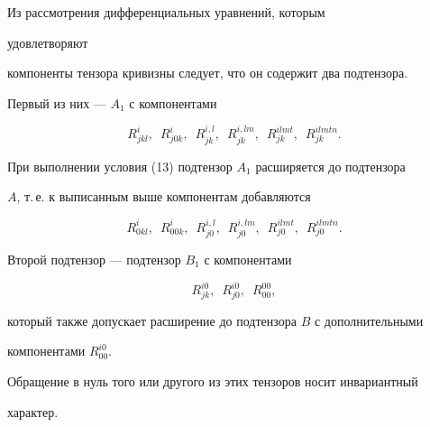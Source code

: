 \begin{notes} Из рассмотрения дифференциальных уравнений, которым 


удовлетворяют 


компоненты тензора кривизны следует, что он содержит два подтензора. 


Первый из них --- $A_1$ с компонентами 


$$ 


R^i_{jkl},\ \; R^i_{j0k},\ \; R^{i,l}_{jk}, \ \; 


R^{i,lm}_{jk}, \ \; R^{ilmt}_{jk}, \ \; R^{ilmtn}_{jk}. 


$$ 


При выполнении условия (13) подтензор $A_1$ расширяется до подтензора 


$A$, т.\,е. к выписанным выше компонентам добавляются 


$$ 


R^i_{0kl}, \ \; R^i_{00k}, \ \; R^{i,l}_{j0}, \ \; 


R^{i,lm}_{j0}, \ \; R^{ilmt}_{j0}, \ \; R^{ilmtn}_{j0}. 


$$ 


Второй подтензор --- подтензор $B_1$ с компонентами 


$$ 


R^{i0}_{jk}, \ \; R^{i0}_{j0}, \ \; R^{00}_{00}, 


$$ 


который также допускает расширение до подтензора $B$ с дополнительными  


компонентами $R^{i0}_{00}$. 


Обращение в нуль того или другого из этих тензоров носит инвариантный 


характер. 


\end{notes} 


 


